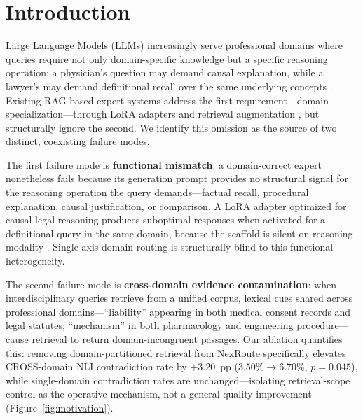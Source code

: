 
\section{Introduction}
\label{sec:introduction}

Large Language Models (LLMs) increasingly serve professional domains where queries
require not only domain-specific knowledge but a specific reasoning operation:
a physician's question may demand causal explanation, while a lawyer's may demand
definitional recall over the same underlying concepts
\citep{brown2020gpt,singhal2023large,guha2023legalbench}.
Existing RAG-based expert systems address the first requirement---domain
specialization---through LoRA adapters and retrieval augmentation
\citep{hu2022lora,dou2024loramoe}, but structurally ignore the second.
We identify this omission as the source of two distinct, coexisting failure modes.

The first failure mode is \textbf{functional mismatch}: a domain-correct expert
nonetheless fails because its generation prompt provides no structural signal
for the reasoning operation the query demands---factual recall, procedural
explanation, causal justification, or comparison.
A LoRA adapter optimized for causal legal reasoning produces suboptimal responses
when activated for a definitional query in the same domain, because the scaffold
is silent on reasoning modality \citep{singhal2023large,guha2023legalbench}.
Single-axis domain routing is structurally blind to this functional heterogeneity.

The second failure mode is \textbf{cross-domain evidence contamination}: when
interdisciplinary queries retrieve from a unified corpus, lexical cues shared
across professional domains---``liability'' appearing in both medical consent
records and legal statutes; ``mechanism'' in both pharmacology and engineering
procedure---cause retrieval to return domain-incongruent passages.
Our ablation quantifies this: removing domain-partitioned retrieval from NexRoute
specifically elevates CROSS-domain NLI contradiction rate by $+3.20$~pp
($3.50\%{\to}6.70\%$, $p{=}0.045$), while single-domain contradiction rates
are unchanged---isolating retrieval-scope control as the operative mechanism,
not a general quality improvement (Figure~\ref{fig:motivation}).

